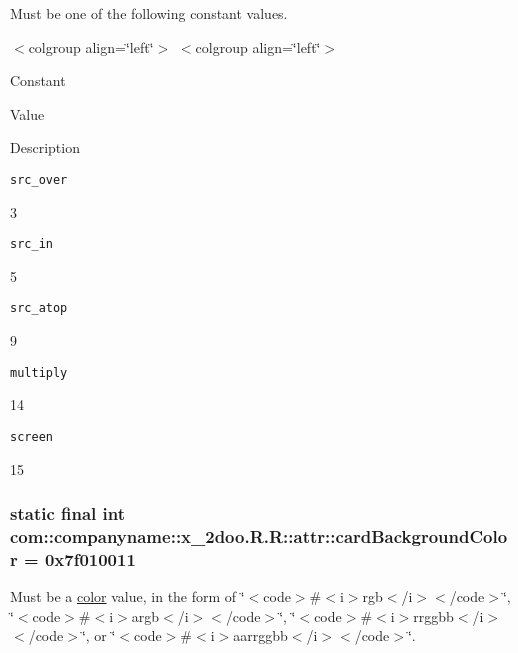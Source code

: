 Must be one of the following constant values. \begin{TabularC}{0}
\hline
\end{TabularC}
$<$colgroup align=\char`\"{}left\char`\"{}$>$ $<$colgroup align=\char`\"{}left\char`\"{}$>$ 

Constant

Value

Description 

{\tt src\_\-over}

3

{\tt src\_\-in}

5

{\tt src\_\-atop}

9

{\tt multiply}

14

{\tt screen}

15\hypertarget{classcom_1_1companyname_1_1x__2doo_1_1_r_1_1attr_3fd3e2c97aeb495a2a084f7fa4bb1d51}{
\subsubsection[{cardBackgroundColor}]{\setlength{\rightskip}{0pt plus 5cm}static final int com::companyname::x\_\-2doo.R.R::attr::cardBackgroundColor = 0x7f010011}}
\label{classcom_1_1companyname_1_1x__2doo_1_1_r_1_1attr_3fd3e2c97aeb495a2a084f7fa4bb1d51}


Must be a \hyperlink{classcom_1_1companyname_1_1x__2doo_1_1_r_1_1color}{color} value, in the form of \char`\"{}$<$code$>$\#$<$i$>$rgb$<$/i$>$$<$/code$>$\char`\"{}, \char`\"{}$<$code$>$\#$<$i$>$argb$<$/i$>$$<$/code$>$\char`\"{}, \char`\"{}$<$code$>$\#$<$i$>$rrggbb$<$/i$>$$<$/code$>$\char`\"{}, or \char`\"{}$<$code$>$\#$<$i$>$aarrggbb$<$/i$>$$<$/code$>$\char`\"{}. 

